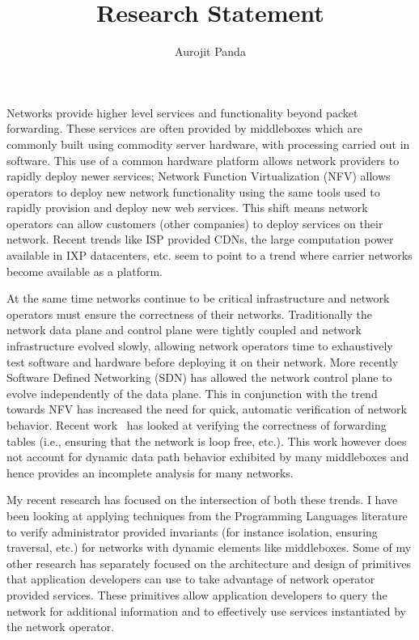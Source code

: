 \documentclass[letterpaper]{article}
\begin{document}
\title{\Large Research Statement}
\author{Aurojit Panda}
\date{}
\thispagestyle{empty}
\maketitle
Networks provide higher level services and functionality beyond packet forwarding. These services
are often provided by middleboxes which are commonly built using commodity server hardware, with
processing carried out in software. This use of a common hardware platform allows network
providers to rapidly deploy newer services; Network Function Virtualization (NFV) allows operators to deploy
new network functionality using the same tools used to rapidly provision and deploy new web services.
This shift means network operators can allow customers (other companies) to deploy
services on their network. Recent trends like ISP provided CDNs, the large computation power available in IXP
datacenters, etc. seem to point to a trend where carrier networks become available as a platform.

At the same time networks continue to be critical infrastructure and network operators must ensure the
correctness of their networks. Traditionally the network data plane and control plane were tightly coupled and
network infrastructure evolved slowly, allowing network operators time to exhaustively test software and
hardware before deploying it on their network. More recently Software Defined Networking (SDN) has
allowed the network control plane to evolve independently of the data plane. This in conjunction with the
trend towards NFV has increased the need for quick, automatic verification of network behavior. Recent
work~\cite{khurshid13veriflow, kazemian2012header} has looked at verifying the correctness of forwarding
tables (i.e., ensuring that the network is loop free, etc.). This work however does not account for dynamic
data path behavior exhibited by many middleboxes and hence provides an incomplete analysis for many networks.

My recent research has focused on the intersection of both these trends. I have been looking at applying
techniques from the Programming Languages literature to verify administrator provided invariants (for instance
isolation, ensuring traversal, etc.) for networks with dynamic elements like middleboxes. Some of my other
research has separately focused on the architecture and design of primitives that application developers can
use to take advantage of network operator provided services. These primitives allow application developers to
query the network for additional information and to effectively use services instantiated by the network
operator.
\end{document}
